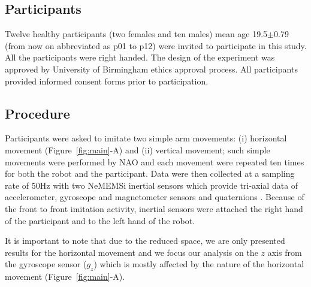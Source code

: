 \documentclass{sig-alternate-05-2015}
\begin{document}

\subsection{Participants}
Twelve healthy participants (two females and ten males)
mean age 19.5$\pm$0.79 (from now on abbreviated as p01 to p12) were invited to 
participate in this study. All the participants were right handed.
The design of the experiment was approved by University of Birmingham ethics approval
process. All participants provided informed consent forms prior to participation.



\subsection{Procedure}
Participants were asked to imitate two simple arm movements: (i) 
horizontal movement (Figure~\ref{fig:main}-A) and (ii) vertical movement;
such simple movements were performed by NAO and each movement were repeated ten times
for both the robot and the participant.
Data were then collected at a sampling rate of 50Hz with two NeMEMSi inertial sensors
which provide tri-axial data of accelerometer, gyroscope and magnetometer sensors and
quaternions \cite{Comotti2014}. Because of the front to front imitation activity, 
inertial sensors were attached the right hand of the participant and to the left hand of the robot.

It is important to note that due to the reduced space, we are only presented
results for the horizontal movement and 
we focus our analysis on the $z$ axis from the gyroscope sensor ($g_z$) 
which is mostly affected by the nature of the horizontal movement (Figure~\ref{fig:main}-A).

\end{document}
